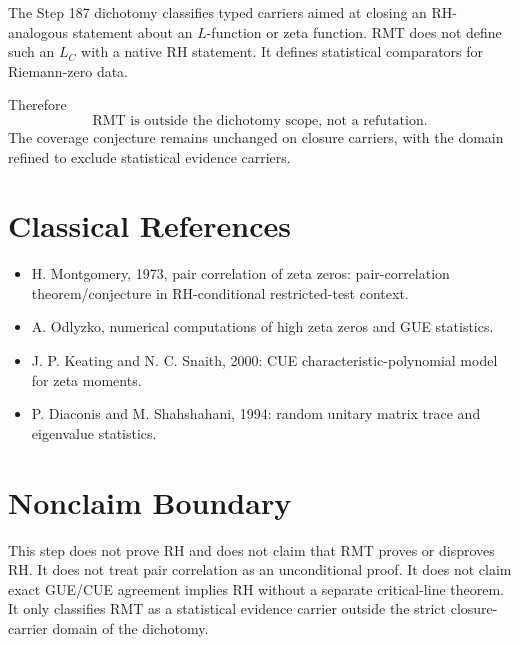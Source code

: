 \documentclass[11pt]{article}
\begin{document}
The Step 187 dichotomy classifies typed carriers aimed at closing an
RH-analogous statement about an \(L\)-function or zeta function.  RMT does not
define such an \(L_C\) with a native RH statement.  It defines statistical
comparators for Riemann-zero data.

Therefore
\[
\boxed{\text{RMT is outside the dichotomy scope, not a refutation.}}
\]
The coverage conjecture remains unchanged on closure carriers, with the
domain refined to exclude statistical evidence carriers.

\section*{Classical References}

\begin{itemize}
\item H. Montgomery, 1973, pair correlation of zeta zeros: pair-correlation
theorem/conjecture in RH-conditional restricted-test context.
\item A. Odlyzko, numerical computations of high zeta zeros and GUE
statistics.
\item J. P. Keating and N. C. Snaith, 2000: CUE characteristic-polynomial
model for zeta moments.
\item P. Diaconis and M. Shahshahani, 1994: random unitary matrix trace and
eigenvalue statistics.
\end{itemize}

\section*{Nonclaim Boundary}

This step does not prove RH and does not claim that RMT proves or disproves
RH.  It does not treat pair correlation as an unconditional proof.  It does
not claim exact GUE/CUE agreement implies RH without a separate critical-line
theorem.  It only classifies RMT as a statistical evidence carrier outside the
strict closure-carrier domain of the dichotomy.
\end{document}
